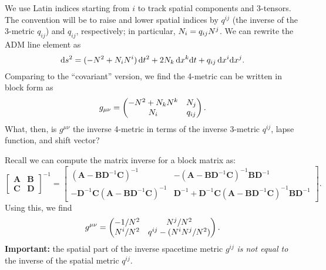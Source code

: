 We use Latin indices starting from $i$ to track spatial components and
3-tensors. The convention will be to raise and lower spatial indices by
$q^{ij}$ (the inverse of the 3-metric $q_{ij}$) and $q_{ij}$, respectively; in particular, $N_{i}=q_{ij}N^{j}$.
We can rewrite the ADM line element as
\begin{equation}
  \mathrm{d} s^{2} = (-N^{2} + N_{i}N^{i})\,\mathrm{d} t^{2}
  + 2 N_{k}\,\mathrm{d} x^{k}\mathrm{d} t
  + q_{ij}\,\mathrm{d} x^{i}\mathrm{d} x^{j}.
\end{equation}
Comparing to the ``covariant'' version, we find the 4-metric can be
written in block form as
\begin{equation}
  g_{\mu\nu} = \begin{pmatrix}
    -N^{2} + N_{k}N^{k} & N_{j}\\
    N_{i} & q_{ij}
\end{pmatrix}.
\end{equation}
What, then, is $g^{\mu\nu}$ the inverse 4-metric in terms of the
inverse 3-metric $q^{ij}$, lapse function, and shift vector?

Recall we can compute the matrix inverse for a block matrix as:
\begin{equation}
  \begin{bmatrix}
    \mathbf{A} & \mathbf{B} \\
    \mathbf{C} & \mathbf{D}
   \end{bmatrix}^{-1} 
    = \begin{bmatrix}
     \left(\mathbf{A} - \mathbf{BD}^{-1}\mathbf{C}\right)^{-1} &
    -\left(\mathbf{A} - \mathbf{BD}^{-1}\mathbf{C}\right)^{-1}\mathbf{BD}^{-1} \\
    -\mathbf{D}^{-1}\mathbf{C}\left(\mathbf{A} - \mathbf{BD}^{-1}\mathbf{C}\right)^{-1} &
    \mathbf{D}^{-1} + \mathbf{D}^{-1}\mathbf{C}\left(\mathbf{A} - \mathbf{BD}^{-1}\mathbf{C}\right)^{-1}\mathbf{BD}^{-1}
  \end{bmatrix}.
\end{equation}
Using this, we find
\begin{equation}
  g^{\mu\nu}
  = \begin{pmatrix} -1/N^{2} & N^{j}/N^{2}\\
    N^{i}/N^{2} & q^{ij} - (N^{i}N^{j}/N^{2})
  \end{pmatrix}.
\end{equation}
\textbf{Important:} the spatial part of the inverse spacetime metric
$g^{ij}$ \emph{is not equal to} the inverse of the spatial metric $q^{ij}$.

